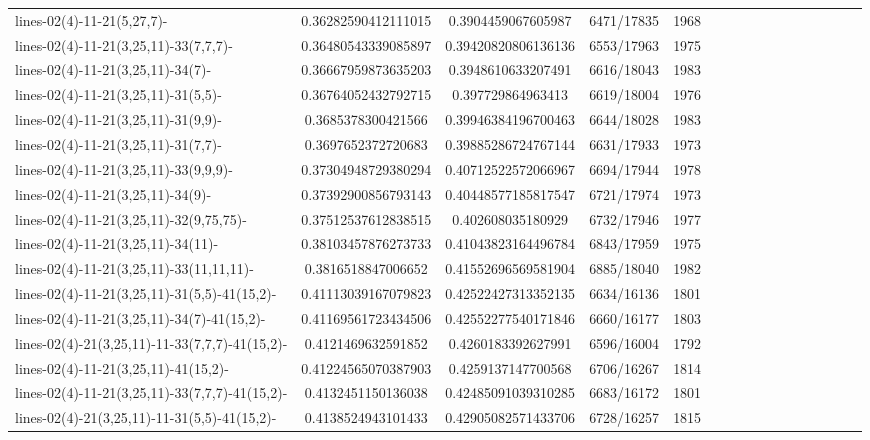 \documentclass[12pt,oneside]{report}			%
\begin{document}
\begin{landscape}
\begin{longtable}{ | p{5cm} | *{15}{c|}}
lines-02(4)-11-21(5,27,7)-                        & 0.36282590412111015 & 0.3904459067605987  & 6471/17835  & 1968 \\
lines-02(4)-11-21(3,25,11)-33(7,7,7)-            & 0.36480543339085897 & 0.39420820806136136 & 6553/17963  & 1975 \\
lines-02(4)-11-21(3,25,11)-34(7)-                 & 0.36667959873635203 & 0.3948610633207491  & 6616/18043  & 1983 \\
lines-02(4)-11-21(3,25,11)-31(5,5)-               & 0.36764052432792715 & 0.397729864963413   & 6619/18004  & 1976 \\
lines-02(4)-11-21(3,25,11)-31(9,9)-               & 0.3685378300421566  & 0.39946384196700463 & 6644/18028  & 1983 \\
lines-02(4)-11-21(3,25,11)-31(7,7)-               & 0.3697652372720683  & 0.39885286724767144 & 6631/17933  & 1973 \\
lines-02(4)-11-21(3,25,11)-33(9,9,9)-             & 0.37304948729380294 & 0.40712522572066967 & 6694/17944  & 1978 \\
lines-02(4)-11-21(3,25,11)-34(9)-                 & 0.37392900856793143 & 0.40448577185817547 & 6721/17974  & 1973 \\
lines-02(4)-11-21(3,25,11)-32(9,75,75)-           & 0.37512537612838515 & 0.402608035180929   & 6732/17946  & 1977 \\
lines-02(4)-11-21(3,25,11)-34(11)-                & 0.38103457876273733 & 0.41043823164496784 & 6843/17959  & 1975 \\
lines-02(4)-11-21(3,25,11)-33(11,11,11)-           & 0.3816518847006652  & 0.41552696569581904 & 6885/18040  & 1982 \\
lines-02(4)-11-21(3,25,11)-31(5,5)-41(15,2)-      & 0.41113039167079823 & 0.42522427313352135 & 6634/16136  & 1801 \\
lines-02(4)-11-21(3,25,11)-34(7)-41(15,2)-        & 0.41169561723434506 & 0.42552277540171846 & 6660/16177  & 1803 \\
lines-02(4)-21(3,25,11)-11-33(7,7,7)-41(15,2)-   & 0.4121469632591852  & 0.4260183392627991  & 6596/16004  & 1792 \\
lines-02(4)-11-21(3,25,11)-41(15,2)-              & 0.41224565070387903 & 0.4259137147700568  & 6706/16267  & 1814 \\
lines-02(4)-11-21(3,25,11)-33(7,7,7)-41(15,2)-   & 0.4132451150136038  & 0.42485091039310285 & 6683/16172  & 1801 \\
lines-02(4)-21(3,25,11)-11-31(5,5)-41(15,2)-      & 0.4138524943101433  & 0.42905082571433706 & 6728/16257  & 1815 \\

\end{longtable}
\end{landscape}
\end{document}
